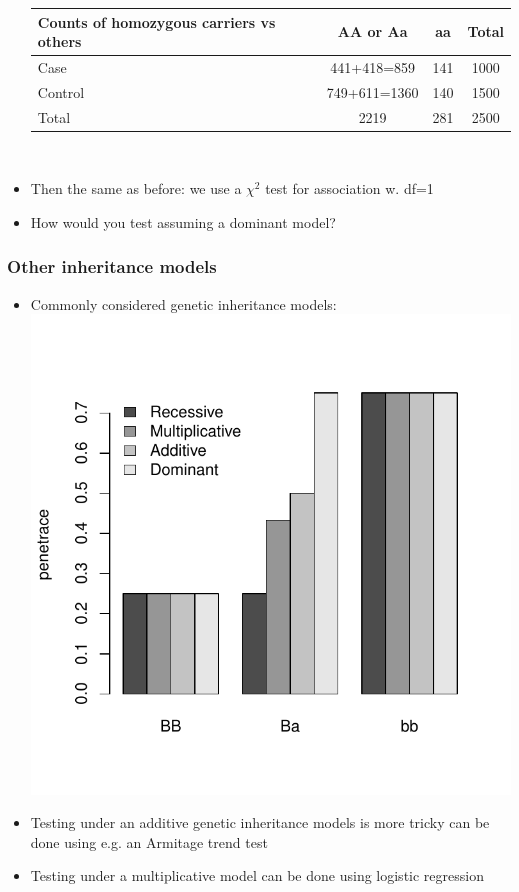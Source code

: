 \documentclass[xcolor=pdftex,dvipsnames,table,10pt]{beamer}
\begin{document}
\begin{frame}
\begin{itemize}
\footnotesize \begin{tabular}{|l|c|c|c|}
\hline
 \textbf{Counts of homozygous carriers vs others} & AA or Aa & aa & Total \\
\hline
Case &441+418=859 & 141 & 1000\\
\hline
Control & 749+611=1360 & 140 & 1500\\
\hline
Total & 2219 & 281 & 2500\\
\hline
\end{tabular}\\\vspace{0.4cm}
\item<3-> \small Then the same as before: we use a $\chi^2$ test for association w. df=1%
\item<4-> How would you test assuming a dominant model?
\end{itemize}
\end{frame}

\begin{frame}
\frametitle{Other inheritance models}
\small \vspace{-.25cm}
  \begin{itemize}
\item Commonly considered genetic inheritance models:\\
           \includegraphics[scale=0.5,trim = 0mm 20mm 0mm 10mm, clip]{geneticModels.pdf}
  \item Testing under an additive genetic inheritance models is more tricky can be done using e.g. an Armitage trend test
  \item Testing under a multiplicative model can be done using logistic regression
  \end{itemize}
\end{frame}
\end{document}
